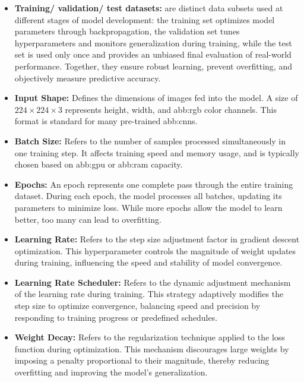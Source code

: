 \begin{itemize}

    \item \textbf{Training/ validation/ test datasets:} are distinct data subsets used at different stages of model development: the training set optimizes model parameters through backpropagation, the validation set tunes hyperparameters and monitors generalization during training, while the test set is used only once and provides an unbiased final evaluation of real-world performance. Together, they ensure robust learning, prevent overfitting, and objectively measure predictive accuracy.

    \item \textbf{Input Shape:} Defines the dimensions of images fed into the model. A size of $224 \times 224 \times 3$ represents height, width, and \gls{abb:rgb} color channels. This format is standard for many pre-trained \gls{abb:cnn}s.

    \item \textbf{Batch Size:} Refers to the number of samples processed simultaneously in one training step. It affects training speed and memory usage, and is typically chosen based on \gls{abb:gpu} or \gls{abb:ram} capacity.

    \item \textbf{Epochs:} An epoch represents one complete pass through the entire training dataset. During each epoch, the model processes all batches, updating its parameters to minimize loss. While more epochs allow the model to learn better, too many can lead to overfitting.

    \item \textbf{Learning Rate:} Refers to the step size adjustment factor in gradient descent optimization. This hyperparameter controls the magnitude of weight updates during training, influencing the speed and stability of model convergence.

    \item \textbf{Learning Rate Scheduler:} Refers to the dynamic adjustment mechanism of the learning rate during training. This strategy adaptively modifies the step size to optimize convergence, balancing speed and precision by responding to training progress or predefined schedules.

    \item \textbf{Weight Decay:} Refers to the regularization technique applied to the loss function during optimization. This mechanism discourages large weights by imposing a penalty proportional to their magnitude, thereby reducing overfitting and improving the model's generalization.

\end{itemize}


